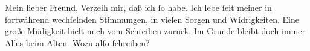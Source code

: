 \pstart\center{}Mein lieber Freund,\pend\vspace{0.5em}
\pstart
           Verzeih mir, daß ich{ }ſo \label{K_L03388-1v}\label{K_L03388-1} habe. Ich
               lebe{ }ſeit meiner \label{K_L03388-2v}\label{K_L03388-2} in
               fortwährend wechſelnden Stimmungen, in vielen Sorgen und Widrigkeiten. Eine große
               Müdigkeit hielt mich vom Schreiben zurück. Im Grunde  bleibt doch immer Alles beim Alten. Wozu alſo{ }ſchreiben?\pend
           
